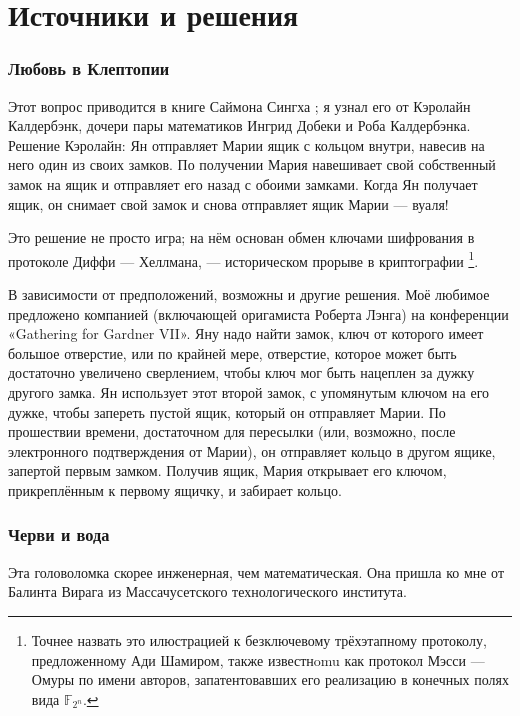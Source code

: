 \section*{Источники и решения}
\subsubsection*{Любовь в Клептопии}

Этот вопрос приводится в книге Саймона Сингха \cite{53};
я узнал его от Кэролайн Калдербэнк, дочери пары математиков Ингрид Добеки и Роба Калдербэнка.
Решение Кэролайн: Ян отправляет Марии ящик с кольцом внутри, навесив на него один из своих замков. По получении Мария навешивает свой собственный замок на ящик и отправляет его назад с обоими замками. Когда Ян получает ящик, он снимает свой замок и снова отправляет ящик Марии --- вуаля!

Это решение не просто игра;
на нём основан обмен ключами шифрования в протоколе Диффи — Хеллмана,
--- историческом прорыве в криптографии%
\footnote{Точнее назвать это илюстрацией к безключевому трёхэтапному протоколу, предложенному Ади Шамиром, также известнomu как протокол Мэсси --- Омуры по имени авторов, запатентовавших его реализацию в конечных полях вида $\mathbb{F}_{2^n}$. \pr}.

В зависимости от предположений, возможны и другие решения.
Моё любимое предложено компанией (включающей оригамиста Роберта Лэнга) на конференции «Ga\-the\-ring for Gardner VII».
Яну надо найти замок, ключ от которого имеет большое отверстие, или по крайней мере, отверстие, которое может быть достаточно увеличено сверлением, чтобы ключ мог быть нацеплен за дужку другого замка.
Ян использует этот второй замок, с упомянутым ключом на его дужке, чтобы запереть пустой ящик, который он отправляет Марии.
По прошествии времени, достаточном для пересылки (или, возможно, после электронного подтверждения от Марии), он отправляет кольцо в другом ящике, запертой первым замком.
Получив ящик, Мария открывает его ключом, прикреплённым к первому ящичку, и забирает кольцо.


\subsubsection*{Черви и вода}

Эта головоломка скорее инженерная, чем математическая.
Она пришла ко мне от Балинта Вирага из Массачусетского технологического института.

